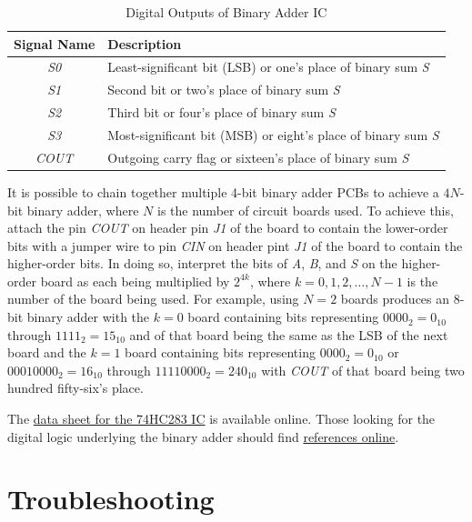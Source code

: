 \documentclass[11pt,oneside]{article}
\begin{document}
\begin{table}[!htb]
	\centering
	\caption{Digital Outputs of Binary Adder IC}
	\begin{tabular}{c | l}
		\hline
		Signal Name & Description \\
		\hline
		\textit{S0} & Least-significant bit (LSB) or one's place of binary sum \textit{S} \\
		\textit{S1} & Second bit or two's place of binary sum \textit{S} \\
		\textit{S2} & Third bit or four's place of binary sum \textit{S} \\
		\textit{S3} & Most-significant bit (MSB) or eight's place of binary sum \textit{S}  \\
		\textit{COUT} & Outgoing carry flag or sixteen's place of binary sum \textit{S} \\
		\hline
	\end{tabular}
	\label{tab:dig_output}
\end{table}

It is possible to chain together multiple 4-bit binary adder PCBs to achieve a $4N$-bit binary adder, where $N$ is the number of circuit boards used. To achieve this, attach the pin \textit{COUT} on header pin \textit{J1} of the board to contain the lower-order bits with a jumper wire to pin \textit{CIN} on header pint \textit{J1} of the board to contain the higher-order bits. In doing so, interpret the bits of \textit{A}, \textit{B}, and \textit{S} on the higher-order board as each being multiplied by $2^{4k}$, where $k = 0, 1, 2, \ldots, N - 1$ is the number of the board being used. For example, using $N = 2$ boards produces an 8-bit binary adder with the $k = 0$ board containing bits representing $0000_{2} = 0_{10}$ through $1111_{2} = 15_{10}$ and  of that board being the same as the LSB of the next board and the $k = 1$ board containing bits representing $0000_{2} = 0_{10}$ or $0001 0000_{2} = 16_{10}$ through $1111 0000_{2} = 240_{10}$ with \textit{COUT} of that board being two hundred fifty-six's place.

The \href{https://cdn.hackaday.io/files/8121347448864/74HC283.pdf}{data sheet for the 74HC283 IC} is available online. Those looking for the digital logic underlying the binary adder should find \href{http://www.electronics-tutorials.ws/combination/comb_7.html}{references online}.


\section{Troubleshooting}
\label{sec:trouble}
\end{document}
